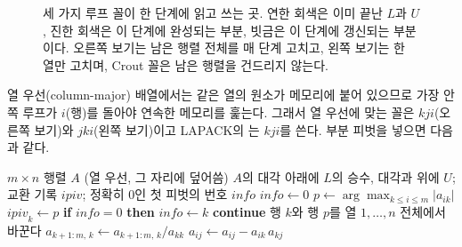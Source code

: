 \begin{figure}[htbp]
\centering
{}
\caption{세 가지 루프 꼴이 한 단계에 읽고 쓰는 곳. 연한 회색은 이미 끝난 $L$과 $U$, 진한 회색은 이 단계에 완성되는 부분, 빗금은 이 단계에 갱신되는 부분이다. 오른쪽 보기는 남은 행렬 전체를 매 단계 고치고, 왼쪽 보기는 한 열만 고치며, Crout 꼴은 남은 행렬을 건드리지 않는다.}
\label{fig:lu-looking}
\end{figure}

열 우선(column-major) 배열에서는 같은 열의 원소가 메모리에 붙어 있으므로 가장 안쪽 루프가 $i$(행)를 돌아야 연속한 메모리를 훑는다. 그래서 열 우선에 맞는 꼴은 $kji$(오른쪽 보기)와 $jki$(왼쪽 보기)이고 LAPACK의 는 $kji$를 쓴다. 부분 피벗을 넣으면 다음과 같다.

\begin{algorithm}[htbp]
\begin{algorithmic}[1]
\Require $m\times n$ 행렬 $A$ (열 우선, 그 자리에 덮어씀)
\Ensure $A$의 대각 아래에 $L$의 승수, 대각과 위에 $U$; 교환 기록 $\mathit{ipiv}$; 정확히 $0$인 첫 피벗의 번호 $\mathit{info}$
\State $\mathit{info}\gets0$
  \State $p\gets\arg\max_{k\le i\le m}|a_{ik}|$ 
  \State $\mathit{ipiv}_k\gets p$
    \State \textbf{if} $\mathit{info}=0$ \textbf{then} $\mathit{info}\gets k$ 
    \State \textbf{continue}
  \EndIf
  \State 행 $k$와 행 $p$를 열 $1,\dots,n$ 전체에서 바꾼다
  \State $a_{k+1:m,\,k}\gets a_{k+1:m,\,k}/a_{kk}$ 
   
      \State $a_{ij}\gets a_{ij}-a_{ik}\,a_{kj}$
    \EndFor
  \EndFor
\EndFor
\end{algorithmic}
\caption{부분 피벗을 쓰는 오른쪽 보기 LU ($kji$ 꼴, LAPACK 의 산술)}
\label{alg:lu-right}
\end{algorithm}

